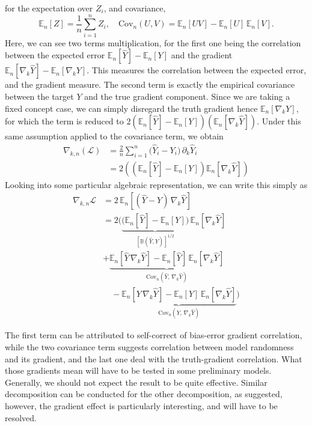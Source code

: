 \documentclass[
  journal=largetwo,
  year=2025,
  volume=37,
]{cup-journal}
\begin{document}
for the expectation over $Z_{i}$, and covariance, 
\begin{equation}
    \mathbb{E}_n[Z] = \frac{1}{n} \sum_{i=1}^n Z_i,
\quad
\mathrm{Cov}_n(U,V) = \mathbb{E}_n[UV] - \mathbb{E}_n[U] \,\mathbb{E}_n[V].
\end{equation}
Here, we can see two terms multiplication, for the first one being the correlation between the expected error $\mathbb{E}_n[\hat{Y}] - \mathbb{E}_n[Y]$ and the gradient $\mathbb{E}_n[\nabla_k \hat{Y}] - \mathbb{E}_n[\nabla_k Y]$. This measures the correlation between the expected error, and the gradient measure. The second term is exactly the empirical covariance between the target $Y$ and the true gradient component. Since we are taking a fixed concept case, we can simply disregard the truth gradient hence $\mathbb{E}_n[\nabla_k Y]$, for which the term is reduced to $2\left( \mathbb{E}_n[\hat{Y}] - \mathbb{E}_n[Y] \right) \left( \mathbb{E}_n[\nabla_k \hat{Y}] \right)$. Under this same assumption applied to the covariance term, we obtain
\begin{equation}
    \begin{split}
        \nabla_{k,n}(\mathcal{L}) 
&= \frac{2}{n}\sum_{i=1}^n \big(\hat Y_i - Y_i\big)\,\partial_k \hat Y_i \\
&= 2\left(
   \left( \mathbb{E}_n[\hat{Y}] - \mathbb{E}_n[Y] \right)
   \mathbb{E}_n[\nabla_k \hat{Y}]
\right)
    \end{split}
\end{equation}
Looking into some particular algebraic representation, we can write this simply as
\begin{align}
    \nabla_{k,n}\mathcal{L}
    &= 2\,\mathbb{E}_n\!\left[(\hat Y - Y)\,\nabla_k \hat Y\right] \\
    &= 2\Bigg(
    \underset{\left[\mathbb{B}(\hat{Y},Y)\right]^{1/2}}{\underbrace{\bigl(\mathbb{E}_n[\hat Y] - \mathbb{E}_n[Y]\bigr)}}\,\mathbb{E}_n[\nabla_k \hat Y]\\
    &+ \underset{\mathrm{Cov}_n(\hat Y,\,\nabla_k \hat Y)}{\underbrace{\mathbb{E}_n[\hat Y\,\nabla_k \hat Y] - \mathbb{E}_n[\hat Y]\,\mathbb{E}_n[\nabla_k \hat Y]}}
     \\
    & \quad -\underset{\mathrm{Cov}_n(Y,\,\nabla_k \hat Y)}{\underbrace{\mathbb{E}_n[Y\,\nabla_k \hat Y] - \mathbb{E}_n[Y]\,\mathbb{E}_n[\nabla_k \hat Y]}}
    \Bigg)
\end{align}

The first term can be attributed to self-correct of bias-error gradient correlation, while the two covariance term suggests correlation between model randomness and its gradient, and the last one deal with the truth-gradient correlation. What those gradients mean will have to be tested in some preliminary models. Generally, we should not expect the result to be quite effective. Similar decomposition can be conducted for the other decomposition, as suggested, however, the gradient effect is particularly interesting, and will have to be resolved. 
\end{document}
